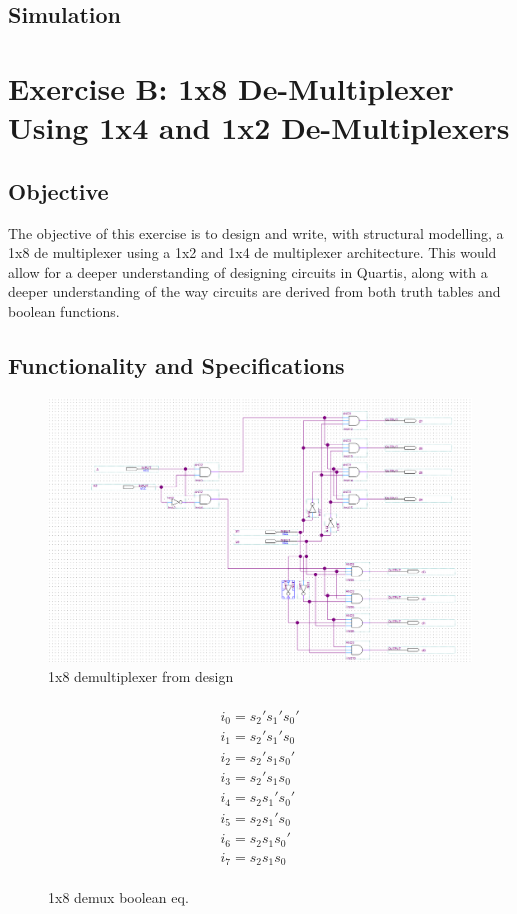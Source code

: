 \documentclass[12pt]{article}
\begin{document}
\subsection{Simulation}
\clearpage


\section{Exercise B: 1x8 De-Multiplexer Using 1x4 and 1x2 De-Multiplexers}
\subsection{Objective}
The objective of this exercise is to design and write, with structural modelling, a 1x8 de multiplexer using a 1x2 and 1x4 de multiplexer architecture. This would allow for a deeper understanding of designing circuits in Quartis, along with a deeper understanding of the way circuits are derived from both truth tables and boolean functions.

\subsection{Functionality and Specifications}

\begin{figure}[h]
\caption{1x8 demultiplexer from design}
\includegraphics[width=\textwidth]{./diagrams/1x8_demux.png}
\end{figure}
\begin{figure}[h]
    \begin{multline}
        \\i_0 = s_2's_1's_0' \\
        i_1 = s_2's_1's_0 \\
        i_2 = s_2's_1s_0' \\
        i_3 = s_2's_1s_0 \\
        i_4 = s_2s_1's_0' \\
        i_5 = s_2s_1's_0 \\
        i_6 = s_2s_1s_0' \\
        i_7 = s_2s_1s_0 \\
    \end{multline}
    \caption{1x8 demux boolean eq.}
\end{figure}
\end{document}
